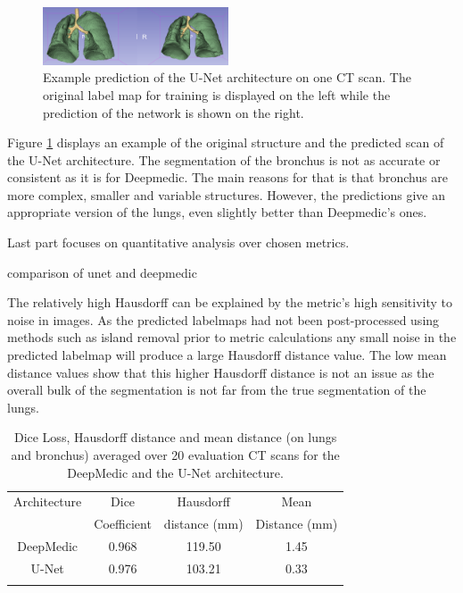 \begin{figure}[h!]
	\includegraphics[width=0.49\textwidth, angle=0]{files/predunet.png}
	\caption{Example prediction of the U-Net architecture on one CT scan. The original label map for training is displayed on the left while the prediction of the network is shown on the right.}
	\label{pred_unet}
\end{figure}

Figure \ref{pred_unet} displays an example of the original structure and the predicted scan of the U-Net architecture. The segmentation of the bronchus is not as accurate or consistent as it is for Deepmedic. The main reasons for that is that bronchus are more complex, smaller and variable structures. However, the predictions give an appropriate version of the lungs, even slightly better than Deepmedic's ones.\newline\newline

Last part focuses on quantitative analysis over chosen metrics.

comparison of unet and deepmedic

The relatively high Hausdorff can be explained by the metric's high sensitivity to noise in images. As the predicted labelmaps had not been post-processed using methods such as island removal prior to metric calculations any small noise in the predicted labelmap will produce a large Hausdorff distance value. The low mean distance values show that this higher Hausdorff distance is not an issue as the overall bulk of the segmentation is not far from the true segmentation of the lungs.

\begin{table}[h!]
	\caption{Dice Loss, Hausdorff distance and mean distance (on lungs and bronchus) averaged over 20 evaluation CT scans for the DeepMedic and the U-Net architecture.}
	\label{table_result}
	\centering
	\setlength{\tabcolsep}{10pt}
	\renewcommand{\arraystretch}{1.5}
	\begin{tabular}{c c c c}
		\hline 
		Architecture & Dice & Hausdorff & Mean \\
		& Coefficient & distance (mm) & Distance (mm) \\ 
		\hline 
		DeepMedic & 0.968 & 119.50 & 1.45 \\ 
		U-Net & 0.976 & 103.21 & 0.33 \\ 
		\hline
		\newline 
	\end{tabular}

\end{table}

